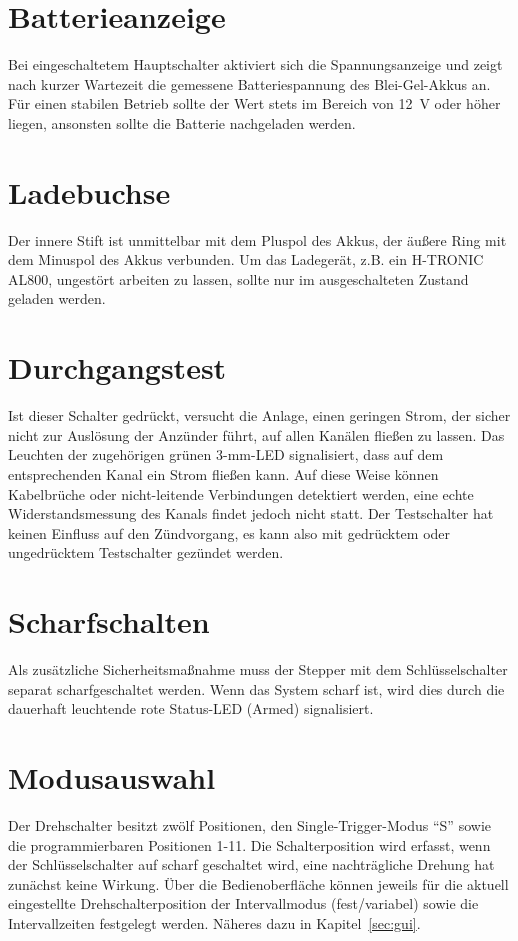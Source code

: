 \documentclass[paper=a4, open=any, numbers=noenddot]{scrbook}
\begin{document}
		\section{Batterieanzeige}

			Bei eingeschaltetem Hauptschalter aktiviert sich die Spannungsanzeige und zeigt nach kurzer Wartezeit die gemessene Batteriespannung des Blei-Gel-Akkus an. Für einen stabilen Betrieb sollte der Wert stets im Bereich von \SI{12}{\volt} oder höher liegen, ansonsten sollte die Batterie nachgeladen werden.

		\section{Ladebuchse}

			Der innere Stift ist unmittelbar mit dem Pluspol des Akkus, der äußere Ring mit dem Minuspol des Akkus verbunden. Um das Ladegerät, z.B. ein H-TRONIC AL800, ungestört arbeiten zu lassen, sollte nur im ausgeschalteten Zustand geladen werden.

		\section{Durchgangstest}

			Ist dieser Schalter gedrückt, versucht die Anlage, einen geringen Strom, der sicher nicht zur Auslösung der Anzünder führt, auf allen Kanälen fließen zu lassen. Das Leuchten der zugehörigen grünen 3-mm-LED signalisiert, dass auf dem entsprechenden Kanal ein Strom fließen kann. Auf diese Weise können Kabelbrüche oder nicht-leitende Verbindungen detektiert werden, eine echte Widerstandsmessung des Kanals findet jedoch nicht statt. Der Testschalter hat keinen Einfluss auf den Zündvorgang, es kann also mit gedrücktem oder ungedrücktem Testschalter gezündet werden.

		\section{Scharfschalten}

			Als zusätzliche Sicherheitsmaßnahme muss der Stepper mit dem Schlüsselschalter separat scharfgeschaltet werden. Wenn das System scharf ist, wird dies durch die dauerhaft leuchtende rote Status-LED (Armed) signalisiert.

		\section{Modusauswahl}
			Der Drehschalter besitzt zwölf Positionen, den Single-Trigger-Modus \enquote{S} sowie die programmierbaren Positionen 1-11. Die Schalterposition wird erfasst, wenn der Schlüsselschalter auf scharf geschaltet wird, eine nachträgliche Drehung hat zunächst keine Wirkung. Über die Bedienoberfläche können jeweils für die aktuell eingestellte Drehschalterposition der Intervallmodus (fest/variabel) sowie die Intervallzeiten festgelegt werden. Näheres dazu in Kapitel~\ref{sec:gui}.
\end{document}
